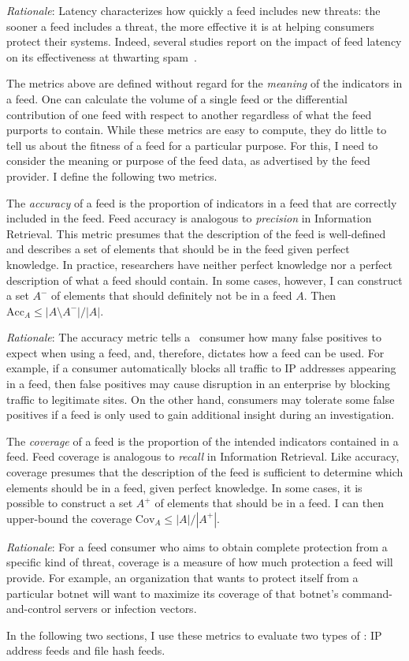 \emph{Rationale}: Latency characterizes how quickly a feed includes new
threats: the sooner a feed includes a threat, the more effective it is at
helping consumers protect their systems. Indeed, several studies report on the
impact of feed latency on its effectiveness at
thwarting spam~\cite{blacklisting:weis14,ramachandran2007filtering}.

The metrics above are defined without regard for the \emph{meaning} of the
indicators in a feed. One can calculate the volume of a single feed or the
differential contribution of one feed with respect to another regardless of
what the feed purports to contain. While these metrics are easy to compute,
they do little to tell us about the fitness of a feed for a particular purpose.
For this, I need to consider the meaning or purpose of the feed data, as
advertised by the feed provider. I define the following two metrics.

\metrics {} The \emph{accuracy} of a feed is the proportion of
indicators in a feed that are correctly included in the feed. Feed accuracy is
analogous to \emph{precision} in Information Retrieval. This metric presumes
that the description of the feed is well-defined and describes a set of elements
that should be in the feed given perfect knowledge. In practice, 
researchers have neither
perfect knowledge nor a perfect description of what a feed should contain. In
some cases, however, I can construct a set $A^-$ of elements that should
definitely not be in a feed $A$. Then $\mathrm{Acc}_A \le |A\setminus A^-|/|A|$.

\emph{Rationale}: The accuracy metric tells a \ti\ consumer how many false
positives to expect when using a feed, and, therefore, dictates how a feed
can be used. For example, if a consumer automatically blocks all traffic to
IP addresses appearing in a feed, then false positives may cause disruption
in an enterprise by blocking traffic to legitimate sites. On the other hand,
consumers may tolerate some false positives if a feed is only used to
gain additional insight during an investigation.

\metrics {} The \emph{coverage} of a feed is the proportion
of the intended indicators contained in a feed. Feed coverage is analogous
to \emph{recall} in Information Retrieval. Like accuracy, coverage presumes
that the description of the feed is sufficient to determine which elements
should be in a feed, given perfect knowledge. In some cases, it is possible
to construct a set $A^+$ of elements that should be in a feed. I can then
upper-bound the coverage $\mathrm{Cov}_A \le |A|/|A^+|$.


\emph{Rationale}: For a feed consumer who aims to obtain complete protection
from a specific kind of threat, coverage is a measure of how much protection
a feed will provide. For example, an organization that wants to protect itself
from a particular botnet will want to maximize its coverage of that botnet's
command-and-control servers or infection vectors.

In the following two sections, I use these metrics to evaluate two types of
\ti: IP address feeds and file hash feeds.
